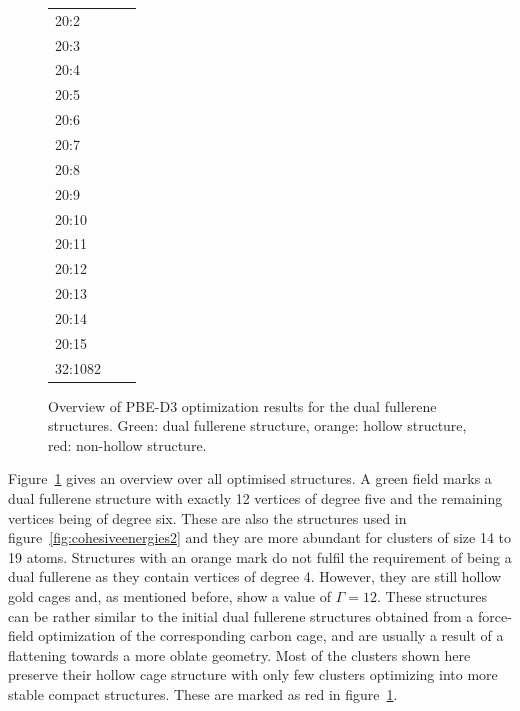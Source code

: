 \begin{figure}[htbp]
\begin{tabular}{lp{3cm}|p{3cm}}
		20:2    & \cellcolor{mygreen}         & \cellcolor{mygreen}       \\
		20:3    & \cellcolor{myorange}        & \cellcolor{myorange}      \\
		20:4    & \cellcolor{mygreen}         & \cellcolor{mygreen}       \\
		20:5    & \cellcolor{mygreen}         & \cellcolor{mygreen}       \\
		20:6    & \cellcolor{myorange}        & \cellcolor{myorange}      \\
		20:7    & \cellcolor{myorange}        & \cellcolor{mygreen}       \\
		20:8    & \cellcolor{myorange}        & \cellcolor{myorange}      \\
		20:9    & \cellcolor{myorange}        & \cellcolor{myorange}      \\
		20:10   & \cellcolor{myorange}        & \cellcolor{myorange}      \\
		20:11   & \cellcolor{myorange}        & \cellcolor{myorange}      \\
		20:12   & \cellcolor{red}             & \cellcolor{red}           \\
		20:13   & \cellcolor{myorange}        & \cellcolor{myorange}      \\
		20:14   & \cellcolor{mygreen}         & \cellcolor{red}           \\
		20:15   & \cellcolor{myorange}        & \cellcolor{mygreen}       \\
		32:1082 & \cellcolor{mygreen}         & \cellcolor{mygreen}       \\ \bottomrule
	\end{tabular}
	\caption{Overview of PBE-D3 optimization results for the dual fullerene structures. 
	Green: dual fullerene structure, orange: hollow structure, red: non-hollow structure.}
	\label{fig:optOverview}
\end{figure}

Figure~\ref{fig:optOverview} gives an overview over all optimised structures.
A green field marks a dual fullerene structure with exactly 12 vertices of
degree five and the remaining vertices being of degree six. These are also the
structures used in figure~\ref{fig:cohesiveenergies2} and they are more
abundant for clusters of size 14 to 19 atoms. Structures with an orange mark do
not fulfil the requirement of being a dual fullerene as they contain vertices
of degree 4. However, they are still hollow gold cages and, as mentioned
before, show a value of $\Gamma=12$. These structures can be rather similar to
the initial dual fullerene structures obtained from a force-field optimization
of the corresponding carbon cage, and are usually a result of a flattening
towards a more oblate geometry.  Most of the clusters shown here preserve their
hollow cage structure with only few clusters optimizing into more stable
compact structures. These are marked as red in figure~\ref{fig:optOverview}.

